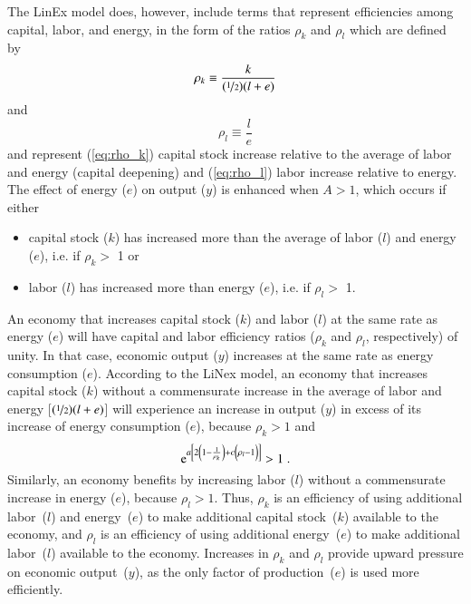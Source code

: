 \documentclass[preprint,authoryear,12pt]{elsarticle}
\begin{document}
The LinEx model does, however, include terms that represent
efficiencies among capital, labor, and energy, in the form of 
the ratios $\rho_k$ and $\rho_l$ which are defined by
%
\begin{equation} \label{eq:rho_k}
  \rho_k \equiv \frac{k}{(\nicefrac{1}{2})(l+e)}
\end{equation}
%
and
%
\begin{equation} \label{eq:rho_l}
  \rho_l \equiv \frac{l}{e}
\end{equation}
%
and represent 
%
(\ref{eq:rho_k}) capital stock increase relative to the average of labor and energy (capital deepening) and 
(\ref{eq:rho_l}) labor increase relative to energy.
The effect of energy ($e$) on output ($y$) is enhanced when $A > 1$,
which occurs if either
%
\begin{itemize}
\item{capital stock ($k$) has increased more than the average 
      of labor ($l$) and energy ($e$), i.e. if $\rho_k >$ 1 or}
\item{labor ($l$) has increased more than energy ($e$), i.e. if $\rho_l >$ 1.}
\end{itemize}
%
An economy that increases 
capital stock ($k$) and labor ($l$) at the same rate as energy ($e$) will have
capital and labor efficiency ratios ($\rho_k$ and $\rho_l$, respectively) of unity.
In that case, economic output ($y$) increases at the same rate as energy consumption ($e$).
According to the LiNex model, an economy that increases 
capital stock ($k$) without a commensurate increase in the average of labor
and energy [$(\nicefrac{1}{2})(l+e)$] will experience an increase in output ($y$) in excess 
of its increase of energy consumption ($e$), because $\rho_k > 1$ and
%
\begin{equation}
    \mathrm{e}^{a \left[2 \left(1 - \frac{1}{\rho_k} \right) 
    + c \left(\vphantom{\frac{1}{\rho_k}}\rho_l - 1 \right)\right]}
	> 1 \; .
\end{equation}
%
Similarly, an economy benefits by increasing labor ($l$) 
without a commensurate increase in energy ($e$), because $\rho_l > 1$. 
Thus, $\rho_k$ is an 
efficiency of using additional labor~($l$) and energy~($e$) to make 
additional capital stock~($k$) available to the economy, 
and $\rho_l$ is an efficiency of using additional energy~($e$) to make 
additional labor~($l$) available to the economy. 
Increases in $\rho_k$ and $\rho_l$ provide upward pressure on economic output~($y$),
as the only factor of production~($e$) is used more efficiently.
\end{document}
